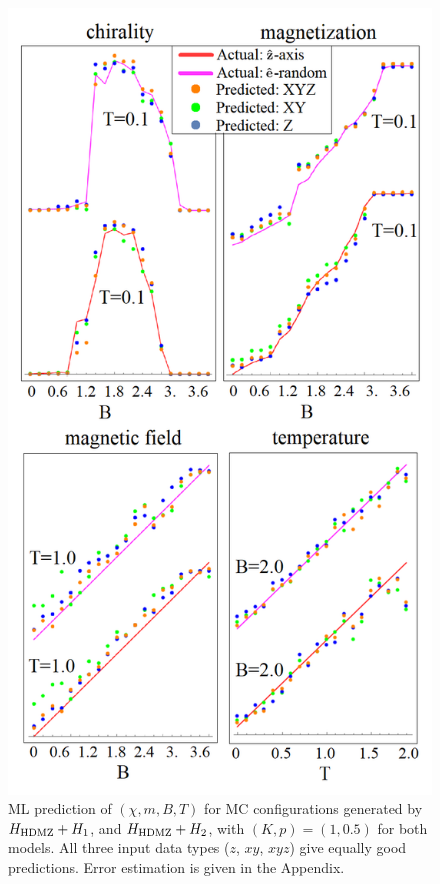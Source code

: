 \documentclass[reprint,amsmath,amssymb,aps,showpacs,superscriptaddress,prb]{revtex4-1}
\begin{document}
\begin{figure}[t]
\includegraphics[scale=0.36]{fig4.png}
\caption{ML prediction of $(\chi, m, B, T)$ for MC configurations generated by $H_{\rm HDMZ}+ H_1$, and $H_{\rm HDMZ} + H_2$, with $(K,p)=(1, 0.5)$ for both models.  All three input data types ($z$, $xy$, $xyz$) give equally good predictions. Error estimation is given in the Appendix. } \label{fig:4}
\end{figure}
\end{document}
